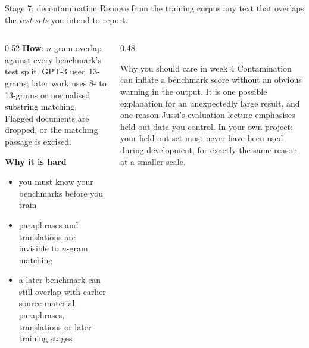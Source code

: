 \documentclass[aspectratio=169,10pt]{beamer}
\begin{document}
\begin{frame}[shrink=9]{Stage 7: decontamination}
  Remove from the training corpus any text that overlaps the \emph{test sets}
  you intend to report.
  \vspace{0.6em}
  \begin{columns}[T]
    \begin{column}{0.52\textwidth}
      \textbf{How}: $n$-gram overlap against every benchmark's test split.
      GPT-3 used 13-grams; later work uses 8- to 13-grams or normalised
      substring matching. Flagged documents are dropped, or the matching
      passage is excised.
      \vspace{0.5em}

      \textbf{Why it is hard}
      \begin{itemize}
        \item you must know your benchmarks before you train
        \item paraphrases and translations are invisible to $n$-gram matching
        \item a later benchmark can still overlap with earlier source material,
          paraphrases, translations or later training stages
      \end{itemize}
    \end{column}
    \begin{column}{0.48\textwidth}
      \begin{block}{Why you should care in week 4}
        \small
        Contamination can inflate a benchmark score without an obvious warning
        in the output.
        \vspace{0.4em}
        It is one possible explanation for an unexpectedly large result, and
        one reason Jussi's evaluation lecture emphasises held-out data you
        control.
        \vspace{0.4em}
        In your own project: your held-out set must never have been used during
        development, for exactly the same reason at a smaller scale.
      \end{block}
    \end{column}
  \end{columns}
\end{frame}
\end{document}
